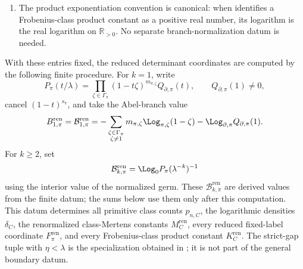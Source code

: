 \begin{proposition}
\begin{enumerate}[label=\textup{(\roman*)},leftmargin=*]
    Finite truncation levels, rational tail radii, and interval enclosures are
    later reproducibility outputs for approximating the derived sums; they are
    not hidden coordinates in \(\mathfrak D_{\partial}^{\mathrm{ren}}\).
    \item The product exponentiation convention is canonical: when
     identifies a Frobenius-class
    product constant as a positive real number, its logarithm is the real
    logarithm on \(\mathbb R_{>0}\).  No separate branch-normalization datum
    is needed.
  \end{enumerate}
  With these entries fixed, the reduced determinant coordinates are computed
  by the following finite procedure.  For \(k=1\), write
  \[
    P_\pi(t/\lambda)
    =
    \prod_{\zeta\in\Gamma_\pi}(1-t\zeta)^{m_{\pi,\zeta}}
      Q_{\partial,\pi}(t),
      \qquad Q_{\partial,\pi}(1)\ne0,
  \]
  cancel \((1-t)^{s_\pi}\), and take the Abel-branch value
  \[
    B_{1,\pi}^{\mathrm{ren}}
    =
    \mathcal B_{1,\pi}^{\mathrm{ren}}
    =
    -\sum_{\substack{\zeta\in\Gamma_\pi\\\zeta\ne1}}
      m_{\pi,\zeta}\Log_{\pi,\zeta}(1-\zeta)
    -\Log_{\partial,\pi} Q_{\partial,\pi}(1).
  \]
  For \(k\ge2\), set
  \[
    \mathcal B_{k,\pi}^{\mathrm{ren}}
    =
    \Log_0 P_\pi(\lambda^{-k})^{-1}
  \]
  using the interior value of the normalized germ.  These
  \(\mathcal B_{k,\pi}^{\mathrm{ren}}\) are derived values from the finite
  datum; the sums below use them only after this computation.
  This datum determines
  all primitive class counts \(p_{n,C}\), the logarithmic densities
  \(\delta_C\), the renormalized class-Mertens constants
  \(M_C^{\mathrm{ren}}\), every reduced fixed-label coordinate
  \(F_\pi^{\mathrm{ren}}\), and every Frobenius-class product constant
  \(K_C^{\mathrm{ren}}\).  The strict-gap tuple with \(\eta<\lambda\) is the
  specialization obtained in ; it is not
  part of the general boundary datum.
\end{proposition}

